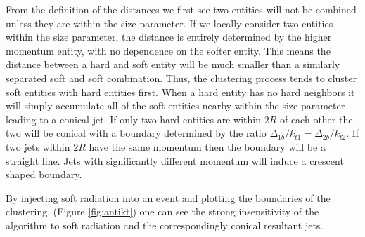 From the definition of the distances we first see two entities will not be combined unless they are within
the size parameter. If we locally consider two entities within the size parameter, 
the distance is entirely determined by the higher momentum entity, with no dependence on the softer entity. 
This means the distance between a hard and soft entity will be much smaller than a 
similarly separated soft and soft combination. Thus, the clustering process tends to cluster soft entities with
hard entities first. When a hard entity has no hard neighbors it will simply accumulate 
all of the soft entities nearby within the size parameter 
leading to a conical jet. If only two hard entities are within $2R$ of each other the two will be conical with a 
boundary determined by the ratio $\Delta_{1b} / k_{t1} = \Delta_{2b} / k_{t2}$. If two jets within $2R$ have 
the same momentum then the boundary will be a straight line. Jets with significantly different momentum will induce
a crescent shaped boundary.

By injecting soft radiation into an event and plotting the boundaries of the clustering, (Figure \ref{fig:antikt}) one 
can see the strong insensitivity of the algorithm to soft radiation and the correspondingly conical resultant jets.

